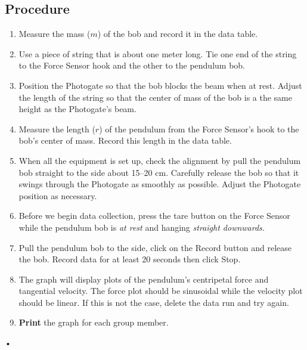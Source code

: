 \documentclass[main.tex]{subfiles}
\begin{document}
\subsection*{Procedure}
\begin{enumerate}
\item
Measure the mass ($m$) of the bob and record it in the data table.
\item
Use a piece of string that is about one meter long. Tie one end of the string to the Force Sensor hook and the other to the pendulum bob.
\item
Position the Photogate so that the bob blocks the beam when at rest. Adjust the length of the string so that the center of mass of the bob is a the same height as the Photogate's beam.
\item
Measure the length ($r$) of the pendulum from the Force Sensor's hook to the bob's center of mass. Record this length in the data table.
\item
When all the equipment is set up, check the alignment by pull the pendulum bob straight to the side about 15--20 cm. Carefully release the bob so that it swings through the Photogate as smoothly as possible. Adjust the Photogate position as necessary.
\item
Before we begin data collection, press the tare button on the Force Sensor while the pendulum bob is \emph{at rest} and hanging \emph{straight downwards.}
\item
Pull the pendulum bob to the side, click on the Record button and release the bob. Record data for at least 20 seconds then click Stop.
\item
The graph will display plots of the pendulum's centripetal force and tangential velocity. The force plot should be sinusoidal while the velocity plot should be linear. If this is not the case, delete the data run and try again.
\item
\textbf{Print} the graph for each group member.
\end{enumerate}•
\end{document}
